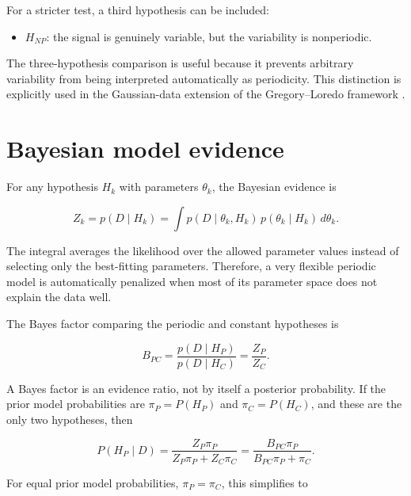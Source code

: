 \documentclass[a4paper]{article}
\begin{document}
For a stricter test, a third hypothesis can be included:

\begin{itemize}

    \item $H_{NP}$: the signal is genuinely variable, but the variability is nonperiodic.

\end{itemize}

The three-hypothesis comparison is useful because it prevents arbitrary variability from being interpreted automatically as periodicity. This distinction is explicitly used in the Gaussian-data extension of the Gregory--Loredo framework \citep{gregory-1999-bayesian-periodic-signal-detection-i-analysis-of-20-years-of-radio-flux-measurements-of-the-x-ray-binary-ls-i-plus-61-303}.

\section{Bayesian model evidence}

For any hypothesis $H_k$ with parameters $\theta_k$, the Bayesian evidence is

\begin{equation}
Z_k
=
p(D\mid H_k)
=
\int p(D\mid \theta_k,H_k)\,p(\theta_k\mid H_k)\,d\theta_k.
\end{equation}

The integral averages the likelihood over the allowed parameter values instead of selecting only the best-fitting parameters. Therefore, a very flexible periodic model is automatically penalized when most of its parameter space does not explain the data well.

The Bayes factor comparing the periodic and constant hypotheses is

\begin{equation}
B_{PC}
=
\frac{p(D\mid H_P)}{p(D\mid H_C)}
=
\frac{Z_P}{Z_C}.
\end{equation}

A Bayes factor is an evidence ratio, not by itself a posterior probability. If the prior model probabilities are $\pi_P=P(H_P)$ and $\pi_C=P(H_C)$, and these are the only two hypotheses, then

\begin{equation}
P(H_P\mid D)
=
\frac{Z_P\pi_P}{Z_P\pi_P+Z_C\pi_C}
=
\frac{B_{PC}\pi_P}{B_{PC}\pi_P+\pi_C}.
\end{equation}

For equal prior model probabilities, $\pi_P=\pi_C$, this simplifies to
\end{document}

